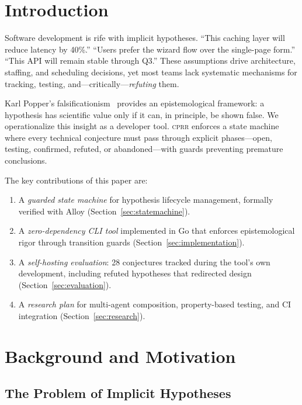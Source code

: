 \documentclass[sigconf,screen]{acmart}
\begin{document}
\maketitle

\section{Introduction}

Software development is rife with implicit hypotheses. ``This caching layer will reduce latency by 40\%.'' ``Users prefer the wizard flow over the single-page form.'' ``This API will remain stable through Q3.'' These assumptions drive architecture, staffing, and scheduling decisions, yet most teams lack systematic mechanisms for tracking, testing, and---critically---\emph{refuting} them.

Karl Popper's falsificationism~\cite{popper1959logic} provides an epistemological framework: a hypothesis has scientific value only if it can, in principle, be shown false. We operationalize this insight as a developer tool. \textsc{cprr} enforces a state machine where every technical conjecture must pass through explicit phases---open, testing, confirmed, refuted, or abandoned---with guards preventing premature conclusions.

The key contributions of this paper are:
\begin{enumerate}
\item A \emph{guarded state machine} for hypothesis lifecycle management, formally verified with Alloy (Section~\ref{sec:statemachine}).
\item A \emph{zero-dependency CLI tool} implemented in Go that enforces epistemological rigor through transition guards (Section~\ref{sec:implementation}).
\item A \emph{self-hosting evaluation}: 28 conjectures tracked during the tool's own development, including refuted hypotheses that redirected design (Section~\ref{sec:evaluation}).
\item A \emph{research plan} for multi-agent composition, property-based testing, and CI integration (Section~\ref{sec:research}).
\end{enumerate}

\section{Background and Motivation}

\subsection{The Problem of Implicit Hypotheses}
\end{document}
